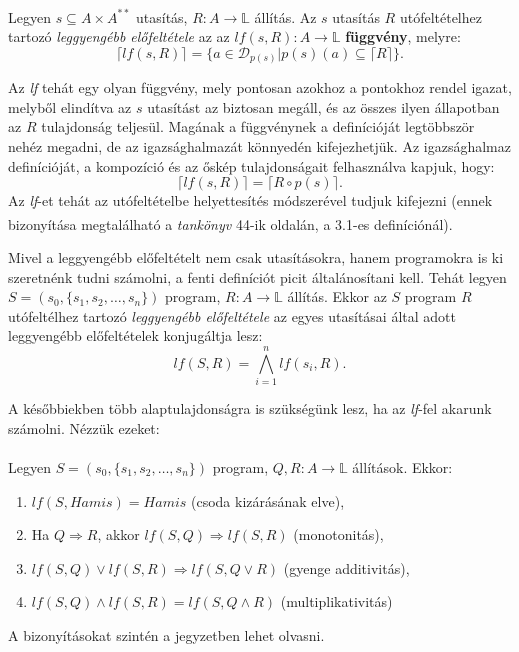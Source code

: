\documentclass[12pt]{article}
\newcommand{\sut}{$s \subseteq A \times A^{**}$ }
\newcommand{\sprog}{$S = (s_0, \{s_1, s_2, \dots, s_n\})$ }
\begin{document}
	\paragraph{}
	Legyen \sut utasítás, $R: A \rightarrow \mathbb{L}$ állítás. Az $s$ utasítás $R$ utófeltételhez tartozó \textit{leggyengébb előfeltétele} az az $lf(s,R): A \rightarrow \mathbb{L}$ \textbf{függvény}, melyre:
	$$ \lceil lf(s,R) \rceil = \{ a \in \mathcal{D}_{p(s)} | p(s)(a) \subseteq \lceil R \rceil \}. $$
	\par Az \textit{lf} tehát egy olyan függvény, mely pontosan azokhoz a pontokhoz rendel igazat, melyből elindítva az $s$ utasítást az biztosan megáll, és az összes ilyen állapotban az $R$ tulajdonság teljesül.
	Magának a függvénynek a definícióját legtöbbször nehéz megadni, de az igazsághalmazát könnyedén kifejezhetjük. Az igazsághalmaz definícióját, a kompozíció és az őskép tulajdonságait felhasználva kapjuk, hogy:
	$$\lceil lf(s,R)\rceil = \lceil R \circ p(s) \rceil.$$
	Az \textit{lf}-et tehát az utófeltételbe helyettesítés módszerével tudjuk kifejezni (ennek bizonyítása megtalálható a \textit{tankönyv}\textsuperscript{\cite{fothi_biblia}} 44-ik oldalán, a 3.1-es definíciónál). 
	
	\par Mivel a leggyengébb előfeltételt nem csak utasításokra, hanem programokra is ki szeretnénk tudni számolni, a fenti definíciót picit általánosítani kell. Tehát legyen \sprog program, $R: A \rightarrow \mathbb{L}$ állítás. Ekkor az $S$ program $R$ utófeltélhez tartozó \textit{leggyengébb előfeltétele} az egyes utasításai által adott leggyengébb előfeltételek konjugáltja lesz:
	$$ lf(S, R) = \bigwedge_{i=1}^n lf(s_i, R). $$
	
	
	A későbbiekben több alaptulajdonságra is szükségünk lesz, ha az \textit{lf}-fel akarunk számolni. Nézzük ezeket:
	\paragraph{}
	Legyen \sprog program, $Q,R: A \rightarrow \mathbb{L}$ állítások. Ekkor:
	\begin{enumerate}
		\item $lf(S, Hamis) = Hamis$ (csoda kizárásának elve),
		\item Ha $Q \Rightarrow R$, akkor $lf(S,Q) \Rightarrow lf(S,R)$ (monotonitás),
		\item $lf(S,Q) \lor lf(S,R) \Rightarrow lf(S, Q\lor R)$ (gyenge additivitás),
		\item $lf(S,Q) \land lf(S,R) = lf(S, Q\land R)$ (multiplikativitás)
	\end{enumerate}
	A bizonyításokat szintén a jegyzetben lehet olvasni.
	
\end{document}
